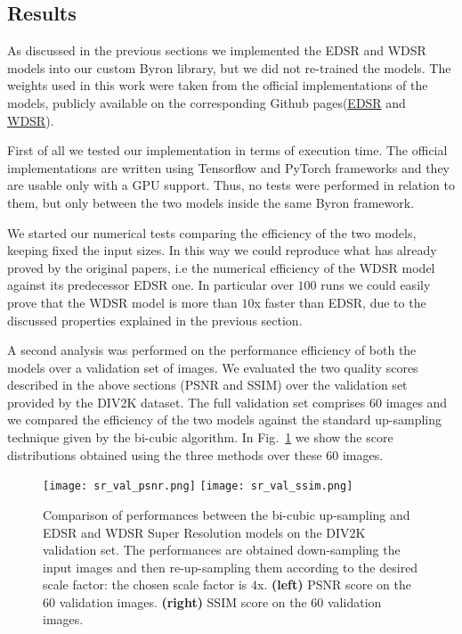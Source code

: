 \documentclass{standalone}
\begin{document}
\subsection[Results]{Results}\label{SR:results}

As discussed in the previous sections we implemented the EDSR and WDSR models into our custom \textsf{Byron} library, but we did not re-trained the models.
The weights used in this work were taken from the official implementations of the models, publicly available on the corresponding Github pages(\href{https://github.com/thstkdgus35/EDSR-PyTorch}{EDSR} and \href{https://github.com/JiahuiYu/wdsr_ntire2018}{WDSR}).

First of all we tested our implementation in terms of execution time.
The official implementations are written using \textsf{Tensorflow} and \textsf{PyTorch} frameworks and they are usable only with a GPU support.
Thus, no tests were performed in relation to them, but only between the two models inside the same \textsf{Byron} framework.

We started our numerical tests comparing the efficiency of the two models, keeping fixed the input sizes.
In this way we could reproduce what has already proved by the original papers, i.e the numerical efficiency of the WDSR model against its predecessor EDSR one.
In particular over $100$ runs we could easily prove that the WDSR model is more than $10$x faster than EDSR, due to the discussed properties explained in the previous section.

A second analysis was performed on the performance efficiency of both the models over a validation set of images.
We evaluated the two quality scores described in the above sections (PSNR and SSIM) over the validation set provided by the DIV2K dataset.
The full validation set comprises $60$ images and we compared the efficiency of the two models against the standard up-sampling technique given by the bi-cubic algorithm.
In Fig.~\ref{fig:sr_validation} we show the score distributions obtained using the three methods over these $60$ images.

\begin{center}
\begin{figure}[htbp]
\centering
\texttt{[image: sr\_val\_psnr.png]}
\quad
\texttt{[image: sr\_val\_ssim.png]}
\caption{Comparison of performances between the bi-cubic up-sampling and EDSR and WDSR Super Resolution models on the DIV2K validation set.
The performances are obtained down-sampling the input images and then re-up-sampling them according to the desired scale factor: the chosen scale factor is $4$x.
\textbf{(left)} PSNR score on the $60$ validation images.
\textbf{(right)} SSIM score on the $60$ validation images.
}
\label{fig:sr_validation}
\end{figure}
\end{center}
\end{document}
